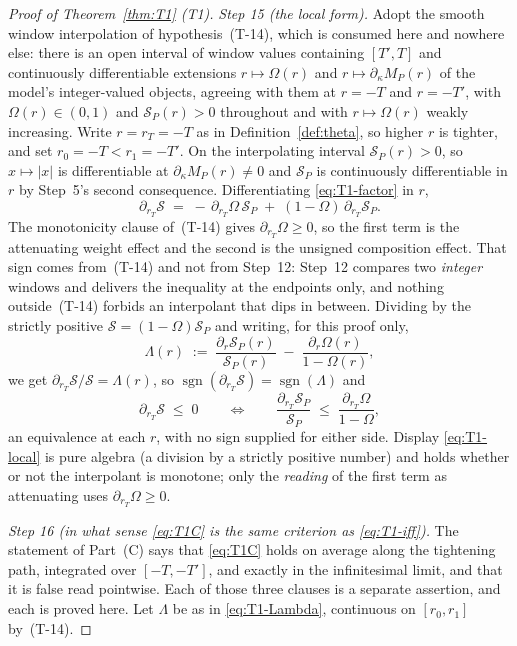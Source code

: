 \documentclass[11pt]{article}
\begin{document}
\begin{proof}[Proof of Theorem~\ref{thm:T1} (T1)]
\emph{Step 15 (the local form).} Adopt the smooth window interpolation of hypothesis~(T-14), which
is consumed here and nowhere else: there is an open interval of window values containing $[T',T]$
and continuously differentiable extensions $r \mapsto \Omega(r)$ and
$r \mapsto \partial_\kappa M_P(r)$ of the model's integer-valued objects, agreeing with them at
$r = -T$ and $r = -T'$, with $\Omega(r) \in (0,1)$ and $\mathcal S_P(r) > 0$ throughout and with
$r \mapsto \Omega(r)$ weakly increasing. Write $r = r_T = -T$ as in Definition~\ref{def:theta}, so
higher $r$ is tighter, and set $r_0 = -T < r_1 = -T'$. On the interpolating interval
$\mathcal S_P(r) > 0$, so $x \mapsto |x|$ is differentiable at $\partial_\kappa M_P(r) \neq 0$ and
$\mathcal S_P$ is continuously differentiable in $r$ by Step~5's second consequence. Differentiating
\eqref{eq:T1-factor} in $r$,
\[
\partial_{r_T}\mathcal S \;=\; -\,\partial_{r_T}\Omega\,\mathcal S_P \;+\; (1-\Omega)\,\partial_{r_T}\mathcal S_P .
\]
The monotonicity clause of~(T-14) gives $\partial_{r_T}\Omega \ge 0$, so the first term is the attenuating
weight effect and the second is the unsigned composition effect. That sign comes from~(T-14) and not
from Step~12: Step~12 compares two \emph{integer} windows and delivers the inequality at the
endpoints only, and nothing outside~(T-14) forbids an interpolant that dips in between. Dividing by
the strictly positive $\mathcal S = (1-\Omega)\mathcal S_P$ and writing, for this proof only,
\begin{equation}
\label{eq:T1-Lambda}
\Lambda(r) \;:=\; \frac{\partial_{r}\mathcal S_P(r)}{\mathcal S_P(r)} \;-\; \frac{\partial_{r}\Omega(r)}{1-\Omega(r)},
\end{equation}
we get $\partial_{r_T}\mathcal S/\mathcal S = \Lambda(r)$, so
$\operatorname{sgn}(\partial_{r_T}\mathcal S) = \operatorname{sgn}(\Lambda)$ and
\begin{equation}
\label{eq:T1-local}
\partial_{r_T}\mathcal S \;\le\; 0
\qquad\Longleftrightarrow\qquad
\frac{\partial_{r_T}\mathcal S_P}{\mathcal S_P} \;\le\; \frac{\partial_{r_T}\Omega}{1-\Omega} ,
\end{equation}
an equivalence at each $r$, with no sign supplied for either side. Display \eqref{eq:T1-local} is
pure algebra (a division by a strictly positive number) and holds whether or not the
interpolant is monotone; only the \emph{reading} of the first term as attenuating uses
$\partial_{r_T}\Omega \ge 0$.

\emph{Step 16 (in what sense \eqref{eq:T1C} is the same criterion as \eqref{eq:T1-iff}).} The
statement of Part~(C) says that \eqref{eq:T1C} holds on average along the tightening path,
integrated over $[-T,-T']$, and exactly in the infinitesimal limit, and that it is false read
pointwise. Each of those three clauses is a separate assertion, and each is proved here. Let
$\Lambda$ be as in \eqref{eq:T1-Lambda}, continuous on $[r_0,r_1]$ by~(T-14).


\end{proof}
\end{document}
